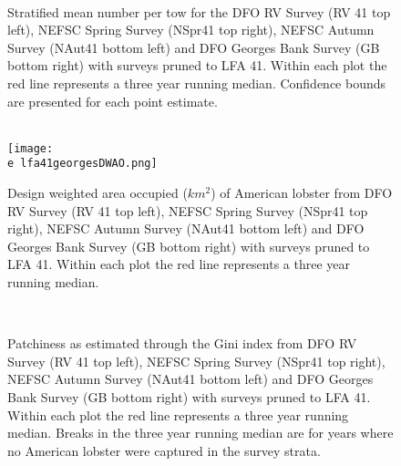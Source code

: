 \documentclass[11pt]{article}
\newcommand{\e}{/backup/bio_data/bio.lobster/figures/} %
\begin{document}
\begin{figure}
\centering
{}\\

\caption{Stratified mean number per tow for the DFO RV Survey (RV 41 top left), NEFSC Spring Survey (NSpr41 top right), NEFSC Autumn Survey (NAut41 bottom left) and DFO Georges Bank Survey (GB bottom right) with surveys pruned to LFA 41. Within each plot the red line represents a three year running median. Confidence bounds are presented for each point estimate.}
\end{figure}
\clearpage




\begin{figure}
\centering
{}\\
    \texttt{[image: \\e lfa41georgesDWAO.png]}

\caption{Design weighted area occupied ($km^2$) of American lobster from DFO RV Survey (RV 41 top left), NEFSC Spring Survey (NSpr41 top right), NEFSC Autumn Survey (NAut41 bottom left) and DFO Georges Bank Survey (GB bottom right) with surveys pruned to LFA 41. Within each plot the red line represents a three year running median. }
\end{figure}
\clearpage



\begin{figure}
\centering
{}\\

\caption{Patchiness as estimated through the Gini index from DFO RV Survey (RV 41 top left), NEFSC Spring Survey (NSpr41 top right), NEFSC Autumn Survey (NAut41 bottom left) and DFO Georges Bank Survey (GB bottom right) with surveys pruned to LFA 41. Within each plot the red line represents a three year running median. Breaks in the three year running median are for years where no American lobster were captured in the survey strata.}
\end{figure}
\clearpage
\end{document}
